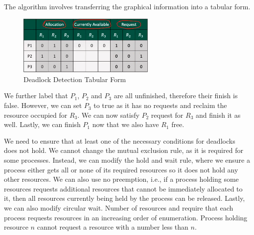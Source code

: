 \documentclass[a4paper]{article}
\theoremstyle{plain}
\theoremstyle{definition}
\newtheorem{defn}{Definition}[section]
\theoremstyle{remark}
\begin{document}
\begin{tcolorbox}[colback=black!3!white,colframe=black!60!white,title=\begin{defn}Deadlock Detecction Algorithm \label{Deadlock Detecction Algorithm}\end{defn}]
The algorithm involves transferring the graphical information into a tabular form. 
\begin{figure}[H]
	\centering
	\includegraphics[width=0.6\textwidth]{sixtynine.png}
	\caption{Deadlock Detection Tabular Form}
	\label{fig:sixtynine-png}
\end{figure}
We further label that $P_1$, $P_2$ and $P_3$ are all unfinished, therefore their finish is false. However, we can set $P_3$ to true as it has no requests and reclaim the resource occupied for $R_3$. We can now satisfy $P_2$ request for $R_3$ and finish it as well. Lastly, we can finish $P_1$ now that we also have $R_1$ free.  
\end{tcolorbox}
\begin{tcolorbox}[colback=black!3!white,colframe=black!60!white,title=\begin{defn}Deadlock Prevention \label{Deadlock Prevention}\end{defn}]
We need to ensure that at least one of the necessary conditions for deadlocks does not hold. We cannot change the mutual exclusion rule, as it is required for some processes. Instead, we can modify the hold and wait rule, where we ensure a process either gets all or none of its required resources so it does not hold any other resources. We can also use no preemption, i.e., if a process holding some resources requests additional resources that cannot be immediately allocated to it, then all resources currently being held by the process can be released. Lastly, we can also modify circular wait. Number of resources and require that each process requests resources in an increasing order of enumeration. Process holding resource $n$ cannot request a resource with a number less than $n$.
\end{tcolorbox}
\end{document}
